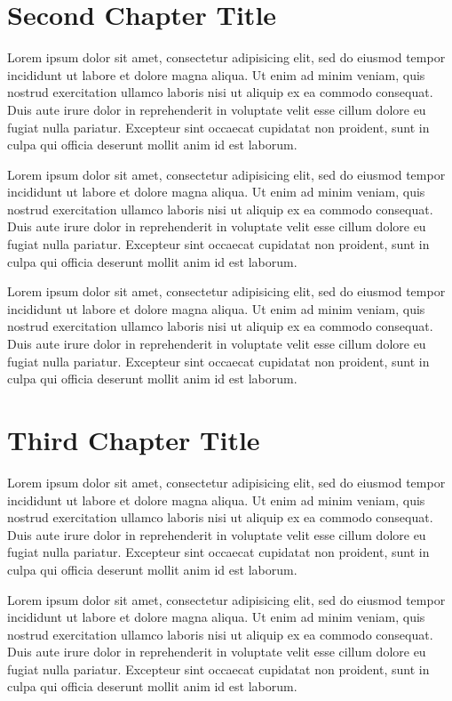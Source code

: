 \documentclass[12pt,letterpaper,oneside,final]{memoir}
\begin{document}
\chapter{Second Chapter Title}
\label{ch-2}
Lorem ipsum dolor sit amet, consectetur adipisicing elit, sed do eiusmod tempor incididunt ut labore et dolore magna aliqua. Ut enim ad minim veniam, quis nostrud exercitation ullamco laboris nisi ut aliquip ex ea commodo consequat. Duis aute irure dolor in reprehenderit in voluptate velit esse cillum dolore eu fugiat nulla pariatur. Excepteur sint occaecat cupidatat non proident, sunt in culpa qui officia deserunt mollit anim id est laborum.

Lorem ipsum dolor sit amet, consectetur adipisicing elit, sed do eiusmod tempor incididunt ut labore et dolore magna aliqua. Ut enim ad minim veniam, quis nostrud exercitation ullamco laboris nisi ut aliquip ex ea commodo consequat. Duis aute irure dolor in reprehenderit in voluptate velit esse cillum dolore eu fugiat nulla pariatur. Excepteur sint occaecat cupidatat non proident, sunt in culpa qui officia deserunt mollit anim id est laborum.

Lorem ipsum dolor sit amet, consectetur adipisicing elit, sed do eiusmod tempor incididunt ut labore et dolore magna aliqua. Ut enim ad minim veniam, quis nostrud exercitation ullamco laboris nisi ut aliquip ex ea commodo consequat. Duis aute irure dolor in reprehenderit in voluptate velit esse cillum dolore eu fugiat nulla pariatur. Excepteur sint occaecat cupidatat non proident, sunt in culpa qui officia deserunt mollit anim id est laborum.

\chapter{Third Chapter Title}
\label{ch-3}
Lorem ipsum dolor sit amet, consectetur adipisicing elit, sed do eiusmod tempor incididunt ut labore et dolore magna aliqua. Ut enim ad minim veniam, quis nostrud exercitation ullamco laboris nisi ut aliquip ex ea commodo consequat. Duis aute irure dolor in reprehenderit in voluptate velit esse cillum dolore eu fugiat nulla pariatur. Excepteur sint occaecat cupidatat non proident, sunt in culpa qui officia deserunt mollit anim id est laborum.

Lorem ipsum dolor sit amet, consectetur adipisicing elit, sed do eiusmod tempor incididunt ut labore et dolore magna aliqua. Ut enim ad minim veniam, quis nostrud exercitation ullamco laboris nisi ut aliquip ex ea commodo consequat. Duis aute irure dolor in reprehenderit in voluptate velit esse cillum dolore eu fugiat nulla pariatur. Excepteur sint occaecat cupidatat non proident, sunt in culpa qui officia deserunt mollit anim id est laborum.
\end{document}
